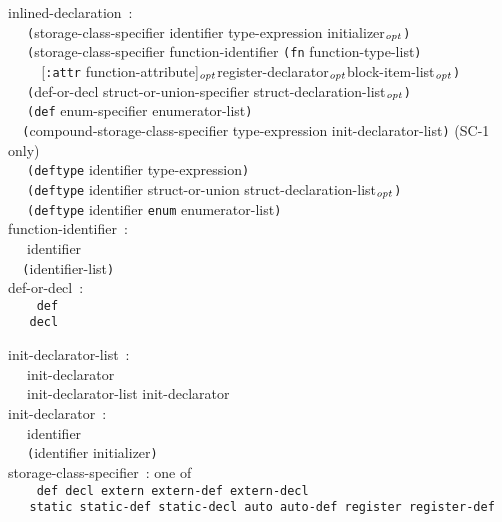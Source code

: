 \documentclass[a4]{article}
\def\|{\verb|} %|
\newcommand{\opt}{$_{{\it opt}}$}
\newcommand{\scoo}{{\rm \hfill (SC-1 only)}}
\begin{document}
\noindent
inlined-declaration{\rm \ :} \\
\|  | {\tt (}storage-class-specifier identifier type-expression initializer\opt{\tt )} \\
\|  | {\tt (}storage-class-specifier function-identifier {\tt (fn} function-type-list{\tt )}\\
\|    | {\rm [}{\tt :attr} function-attribute{\rm ]}\opt register-declarator\opt block-item-list\opt{\tt )} \\ 
\|  | {\tt (}def-or-decl struct-or-union-specifier struct-declaration-list\opt{\tt )} \\
\|  | {\tt (def} enum-specifier enumerator-list{\tt )} \\
\|  | {\tt (}compound-storage-class-specifier type-expression init-declarator-list{\tt )} \scoo \\
\|  | {\tt (deftype} identifier type-expression{\tt )} \\
\|  | {\tt (deftype} identifier struct-or-union struct-declaration-list\opt{\tt )} \\
\|  | {\tt (deftype} identifier {\tt enum} enumerator-list{\tt )} \\

\noindent
function-identifier{\rm \ :} \\
\|  | identifier \\
\|  | {\tt (}identifier-list{\tt )} \\

\noindent
def-or-decl{\rm \ :} \\ \tt
\|  | def \\
\|  | decl \\ \it

\noindent
init-declarator-list{\rm \ :} \\
\|  | init-declarator \\
\|  | init-declarator-list init-declarator \\ 

\noindent
init-declarator{\rm \ :} \\
\|  | identifier \\
\|  | {\tt (}identifier initializer{\tt )} \\ 

\noindent
storage-class-specifier{\rm \ :} {\rm one of} \\  \tt
\|  | def decl extern extern-def extern-decl\\
\|  | static static-def static-decl auto auto-def register register-def \\ \it
\end{document}
